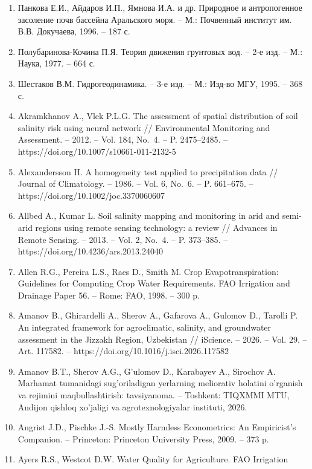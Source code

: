 \documentclass[14pt,a4paper,oneside]{extreport}
\begin{document}
\begin{enumerate}
  Мирцхулава Ц.Е. О надёжности крупных каналов. -- М.: Колос, 1981. --
  318 с.
\item
  Панкова Е.И., Айдаров И.П., Ямнова И.А. и др. Природное и
  антропогенное засоление почв бассейна Аральского моря. -- М.:
  Почвенный институт им. В.В. Докучаева, 1996. -- 187 с.
\item
  Полубаринова-Кочина П.Я. Теория движения грунтовых вод. -- 2-е изд. --
  М.: Наука, 1977. -- 664 с.
\item
  Шестаков В.М. Гидрогеодинамика. -- 3-е изд. -- М.: Изд-во МГУ, 1995.
  -- 368 с.
\item
  Akramkhanov A., Vlek P.L.G. The assessment of spatial distribution of
  soil salinity risk using neural network // Environmental Monitoring
  and Assessment. -- 2012. -- Vol. 184, No.~4. -- P. 2475--2485. --
  https://doi.org/10.1007/s10661-011-2132-5
\item
  Alexandersson H. A homogeneity test applied to precipitation data //
  Journal of Climatology. -- 1986. -- Vol. 6, No.~6. -- P. 661--675. --
  https://doi.org/10.1002/joc.3370060607
\item
  Allbed A., Kumar L. Soil salinity mapping and monitoring in arid and
  semi-arid regions using remote sensing technology: a review //
  Advances in Remote Sensing. -- 2013. -- Vol. 2, No.~4. -- P. 373--385.
  -- https://doi.org/10.4236/ars.2013.24040
\item
  Allen R.G., Pereira L.S., Raes D., Smith M. Crop Evapotranspiration:
  Guidelines for Computing Crop Water Requirements. FAO Irrigation and
  Drainage Paper 56. -- Rome: FAO, 1998. -- 300 p.
\item
  Amanov B., Ghirardelli A., Sherov A., Gafarova A., Gulomov D., Tarolli
  P. An integrated framework for agroclimatic, salinity, and groundwater
  assessment in the Jizzakh Region, Uzbekistan // iScience. -- 2026. --
  Vol. 29. -- Art. 117582. -- https://doi.org/10.1016/j.isci.2026.117582
\item
  Amanov B.T., Sherov A.G., G'ulomov D., Karabayev A., Sirochov A.
  Marhamat tumanidagi sug'oriladigan yerlarning meliorativ holatini
  o'rganish va rejimini maqbullashtirish: tavsiyanoma. -- Toshkent:
  TIQXMMI MTU, Andijon qishloq xo'jaligi va agrotexnologiyalar
  instituti, 2026.
\item
  Angrist J.D., Pischke J.-S. Mostly Harmless Econometrics: An
  Empiricist's Companion. -- Princeton: Princeton University Press,
  2009. -- 373 p.
\item
  Ayers R.S., Westcot D.W. Water Quality for Agriculture. FAO Irrigation

\end{enumerate}
\end{document}
